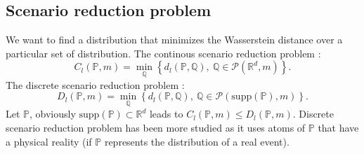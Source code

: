 \documentclass{amsart}
\begin{document}
\subsection{Scenario reduction problem}
We want to find a distribution that minimizes the Wasserstein distance over a particular set of distribution. The continous scenario reduction problem :
$$
C_l(\mathbb{P},m)=\min_\mathbb{Q}\left\{d_l(\mathbb{P},\mathbb{Q}),\: \mathbb{Q}\in\mathcal{P}(\mathbb{R}^d,m)\right\}. 
$$
The discrete scenario reduction problem :
$$
D_l(\mathbb{P},m)=\min_\mathbb{Q}\left\{d_l(\mathbb{P},\mathbb{Q}),\: \mathbb{Q}\in\mathcal{P}(\text{supp}(\mathbb{P}),m)\right\}.
$$
Let $\mathbb{P}$, obviously $\text{supp}(\mathbb{P})\subset \mathbb{R}^d$ leads to $C_l(\mathbb{P},m)\leq D_l(\mathbb{P},m)$. Discrete scenario reduction problem has been more studied as it uses atoms of $\mathbb{P}$ that have a physical reality (if $\mathbb{P}$ represents the distribution of a real event).
\end{document}
